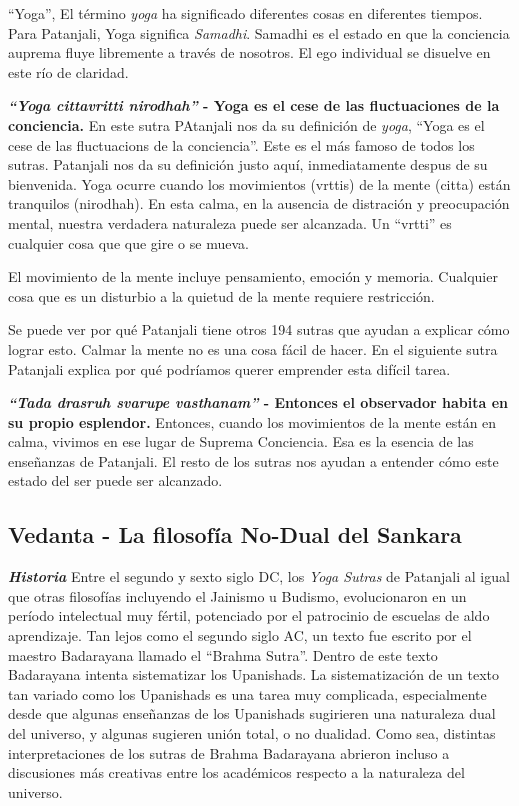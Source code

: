 ``Yoga'', El t\'ermino \textit{yoga} ha significado diferentes cosas en diferentes tiempos. Para Patanjali, Yoga significa \textit{Samadhi}. Samadhi es el estado en que la conciencia auprema fluye libremente a trav\'es de nosotros. El ego individual se disuelve en este río de claridad.

\textbf{\textit{``Yoga cittavritti nirodhah''} - Yoga es el cese de las fluctuaciones de la conciencia.}
En este sutra PAtanjali nos da su definición de \textit{yoga}, ``Yoga es el cese de las fluctuacions de la conciencia''. Este es el más famoso de todos los sutras. Patanjali nos da su definición justo aquí, inmediatamente despus de su bienvenida. Yoga ocurre cuando los movimientos (vrttis) de la mente (citta) están tranquilos (nirodhah). En esta calma, en la ausencia de distración y preocupación mental, nuestra verdadera naturaleza puede ser alcanzada. Un ``vrtti'' es cualquier cosa que que gire o se mueva.

El movimiento de la mente incluye pensamiento, emoción y memoria. Cualquier cosa que es un disturbio a la quietud de la mente requiere restricción.

Se puede ver por qu\'e Patanjali tiene otros 194 sutras que ayudan a explicar cómo lograr esto. Calmar la mente no es una cosa fácil de hacer. En el siguiente sutra Patanjali explica por qu\'e podríamos querer emprender esta difícil tarea.

\textbf{\textit{``Tada drasruh svarupe vasthanam''} - Entonces el observador habita en su  propio esplendor.}
Entonces, cuando los movimientos de la mente están en calma, vivimos en ese lugar de Suprema Conciencia. Esa es la esencia de las enseñanzas de Patanjali. El resto de los sutras nos ayudan a entender cómo este estado del ser puede ser alcanzado.

\subsection{Vedanta - La filosofía No-Dual del Sankara}
\textbf{\textit{Historia}}
Entre el segundo y sexto siglo DC, los \textit{Yoga Sutras} de Patanjali al igual que otras filosofías incluyendo el Jainismo u Budismo, evolucionaron en un período intelectual muy f\'ertil, potenciado por el patrocinio de escuelas de aldo aprendizaje. Tan lejos como el segundo siglo AC, un texto fue escrito por el maestro Badarayana llamado el ``Brahma Sutra''. Dentro de este texto Badarayana intenta sistematizar los Upanishads. La sistematización de un texto tan variado como los Upanishads es una tarea muy complicada, especialmente desde que algunas enseñanzas de los Upanishads sugirieren una naturaleza dual del universo, y algunas sugieren unión total, o no dualidad. Como sea, distintas interpretaciones de los sutras de Brahma Badarayana abrieron incluso a discusiones más creativas entre los acad\'emicos respecto a la naturaleza del universo.

